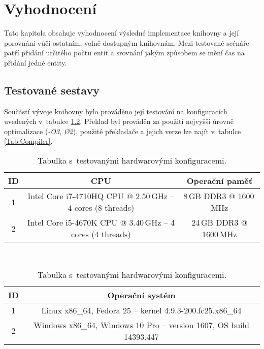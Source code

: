 
\chapter{Vyhodnocení}
\label{Chap:Results}


Tato kapitola obsahuje vyhodnocení výsledné implementace knihovny  a její porovnání vůči ostatním, volně dostupným knihovnám. Mezi testované scénáře patří přidání určitého počtu entit a srovnání jakým způsobem se mění čas na přidání jedné entity. 

\section{Testované sestavy}

Součástí vývoje knihovny bylo prováděno její testování na konfiguracích uvedených v~tabulce \ref{Tab:HW}. Překlad byl prováděn za použití nejvyšší úrovně optimalizace (\emph{-O3}, \emph{\O2}), použité překladače a jejich verze lze najít v~tabulce \ref{Tab:Compiler}. 

\begin{table}[H]
	\begin{center}
		\begin{tabular}{| c | c | c |}
			\hline
			\textbf{ID} & \textbf{CPU} & \textbf{Operační paměť} \\
			\hline
			1 & Intel Core i7-4710HQ CPU @ 2.50\,GHz -- 4 cores (8 threads) & 8\,GB DDR3 @ 1600\,MHz \\
			\hline
			2 & Intel Core i5-4670K CPU @ 3.40\,GHz -- 4 cores (4 threads) & 24\,GB DDR3 @ 1600\,MHz \\
			\hline
		\end{tabular}\\[1em]
		\begin{tabular}{| c | c |}
			\hline
			\textbf{ID} & \textbf{Operační systém} \\
			\hline
			1 & Linux x86\_64, Fedora 25 -- kernel 4.9.3-200.fc25.x86\_64 \\
			\hline
			2 & Windows x86\_64, Windows 10 Pro -- version 1607, OS build 14393.447 \\
			\hline
		\end{tabular}
		\caption{Tabulka s~testovanými hardwarovými konfiguracemi.}
		\label{Tab:HW}
	\end{center}
\end{table}

